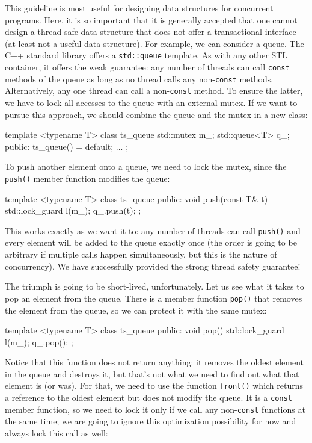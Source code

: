 This guideline is most useful for designing data structures for concurrent programs. Here, it is so important that it is generally accepted that one cannot design a thread-safe data structure that does not offer a transactional interface (at least not a useful data structure). For example, we can consider a queue. The C++ standard library offers a \texttt{std::queue} template. As with any other STL container, it offers the weak guarantee: any number of threads can call \texttt{const} methods of the queue as long as no thread calls any non-\texttt{const} methods. Alternatively, any one thread can call a non-\texttt{const} method. To ensure the latter, we have to lock all accesses to the queue with an external mutex. If we want to pursue this approach, we should combine the queue and the mutex in a new class:

\begin{code}
template <typename T> class ts_queue {
  std::mutex m_;
  std::queue<T> q_;
  public:
  ts_queue() = default;
  ...
};
\end{code}

To push another element onto a queue, we need to lock the mutex, since the \texttt{push()} member function modifies the queue:

\begin{code}
template <typename T> class ts_queue {
  public:
  void push(const T& t) {
    std::lock_guard l(m_);
    q_.push(t);
  }
};
\end{code}

This works exactly as we want it to: any number of threads can call \texttt{push()} and every element will be added to the queue exactly once (the order is going to be arbitrary if multiple calls happen simultaneously, but this is the nature of concurrency). We have successfully provided the strong thread safety guarantee!

The triumph is going to be short-lived, unfortunately. Let us see what it takes to pop an element from the queue. There is a member function \texttt{pop()} that removes the element from the queue, so we can protect it with the same mutex:

\begin{code}
template <typename T> class ts_queue {
  public:
  void pop() {
    std::lock_guard l(m_);
    q_.pop();
  }
};
\end{code}

Notice that this function does not return anything: it removes the oldest element in the queue and destroys it, but that's not what we need to find out what that element is (or was). For that, we need to use the function \texttt{front()} which returns a reference to the oldest element but does not modify the queue. It is a \texttt{const} member function, so we need to lock it only if we call any non-\texttt{const} functions at the same time; we are going to ignore this optimization possibility for now and always lock this call as well:

